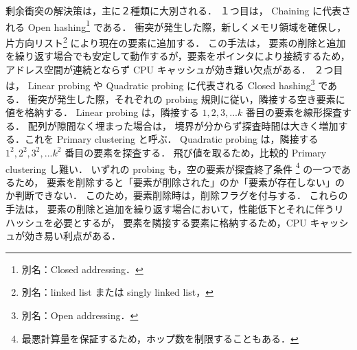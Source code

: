 剰余衝突の解決策は，主に２種類に大別される．
１つ目は，
Chaining に代表される Open hashing\footnote{別名：Closed addressing．} である．
衝突が発生した際，新しくメモリ領域を確保し，片方向リスト\footnote{別名：linked list または singly linked list，} により現在の要素に追加する．
この手法は，
要素の削除と追加を繰り返す場合でも安定して動作するが，要素をポインタにより接続するため，
アドレス空間が連続とならず CPU キャッシュが効き難い欠点がある．
２つ目は，
Linear probing や Quadratic probing に代表される Closed hashing\footnote{別名：Open addressing．} である．
衝突が発生した際，それぞれの probing 規則に従い，隣接する空き要素に値を格納する．
Linear probing は，隣接する $1, 2, 3, ... k$ 番目の要素を線形探査する．
配列が隙間なく埋まった場合は，
境界が分からず探査時間は大きく増加する．これを Primary clustering と呼ぶ．
Quadratic probing は，隣接する $1^2, 2^2, 3^2, ... k^2$ 番目の要素を探査する．
飛び値を取るため，比較的 Primary clustering し難い．
いずれの probing も，空の要素が探査終了条件 \footnote{最悪計算量を保証するため，ホップ数を制限することもある．} の一つであるため，
要素を削除すると「要素が削除された」のか「要素が存在しない」のか判断できない．
このため，要素削除時は，削除フラグを付与する．
これらの手法は，
要素の削除と追加を繰り返す場合において，性能低下とそれに伴うリハッシュを必要とするが，
要素を隣接する要素に格納するため，CPU キャッシュが効き易い利点がある．



